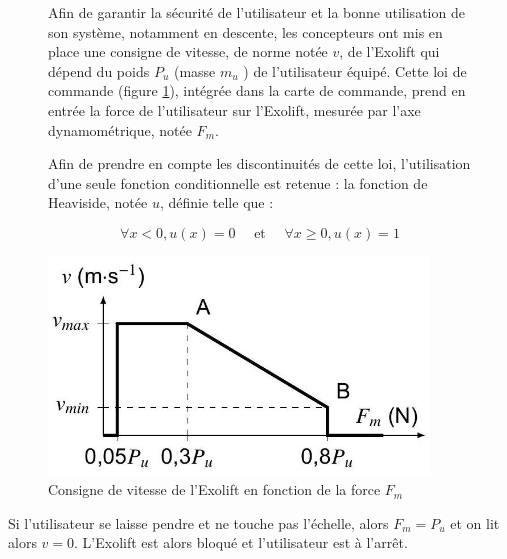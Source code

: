 \begin{figure}[!htb]
\begin{minipage}{0.6\textwidth}

Afin de garantir la sécurité de l'utilisateur et la bonne utilisation de son système, notamment en descente, les concepteurs ont mis en place une consigne de vitesse, de norme notée $v$, de l'Exolift qui dépend du poids $P_{u}$ (masse $m_{u}$ ) de l'utilisateur équipé. Cette loi de commande (figure \ref{fig5}), intégrée dans la carte de commande, prend en entrée la force de l'utilisateur sur l'Exolift, mesurée par l'axe dynamométrique, notée $F_{m}$.

Afin de prendre en compte les discontinuités de cette loi, l'utilisation d'une seule fonction conditionnelle est retenue : la fonction de Heaviside, notée $u$, définie telle que :

$$
\forall x<0, u(x)=0 \quad \text { et } \quad \forall x \geq 0, u(x)=1
$$
\end{minipage}
\begin{minipage}{0.4\textwidth}
\begin{center}
\includegraphics[width=0.9\textwidth]{images/2023_10_30_d11e80da56f59e3b3cdfg-04}
\caption{Consigne de vitesse de l'Exolift en fonction de la force $F_{m}$ \label{fig5}}
\end{center}
\end{minipage}
\end{figure}

\fi
{}

\ifprof
\begin{texteCache}

Si l'utilisateur se laisse pendre et ne touche pas l'échelle, alors
  \(F_{m} = P_{u}\) et on lit alors \(v = 0\). L'Exolift est alors
  bloqué et l'utilisateur est à l'arrêt.

\end{texteCache}

